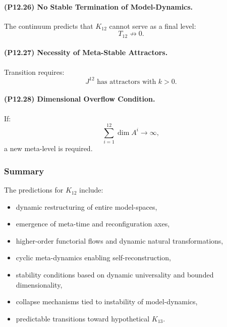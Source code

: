 \paragraph{(P12.26) No Stable Termination of Model-Dynamics.}
The continuum predicts that $K_{12}$ cannot serve as a final level:
\[
T_{12} \not\to 0.
\]

\paragraph{(P12.27) Necessity of Meta-Stable Attractors.}
Transition requires:
\[
J^{12} \text{ has attractors with } k>0.
\]

\paragraph{(P12.28) Dimensional Overflow Condition.}
If:
\[
\sum_{i=1}^{12} \dim A^{i} \to \infty,
\]
a new meta-level is required.

\subsubsection{Summary}

The predictions for $K_{12}$ include:
\begin{itemize}
    \item dynamic restructuring of entire model-spaces,
    \item emergence of meta-time and reconfiguration axes,
    \item higher-order functorial flows and dynamic natural transformations,
    \item cyclic meta-dynamics enabling self-reconstruction,
    \item stability conditions based on dynamic universality and bounded dimensionality,
    \item collapse mechanisms tied to instability of model-dynamics,
    \item predictable transitions toward hypothetical $K_{13}$.
\end{itemize}

